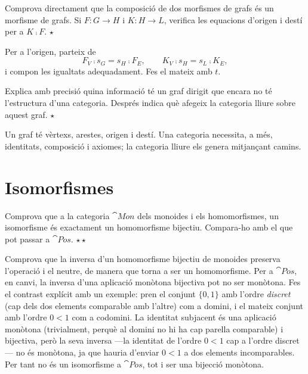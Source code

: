 \begin{exercici}
Comprova directament que la composició de dos morfismes de grafs és un morfisme de grafs. Si $F\colon G\to H$ i $K\colon H\to L$, verifica les equacions d'origen i destí per a $K\comp F$. \hfill{\normalfont$\star$}
\begin{indicacio}
Per a l'origen, parteix de
\[
F_V\comp s_G=s_H\comp F_E,
\qquad
K_V\comp s_H=s_L\comp K_E,
\]
i compon les igualtats adequadament. Fes el mateix amb $t$.
\end{indicacio}
\end{exercici}

\begin{exercici}
Explica amb precisió quina informació té un graf dirigit que encara no té l'estructura d'una categoria. Després indica què afegeix la categoria lliure sobre aquest graf. \hfill{\normalfont$\star$}
\begin{indicacio}
Un graf té vèrtexs, arestes, origen i destí. Una categoria necessita, a més, identitats, composició i axiomes; la categoria lliure els genera mitjançant camins.
\end{indicacio}
\end{exercici}

\section{Isomorfismes}

\begin{exercici}
Comprova que a la categoria $\cat{Mon}$ dels monoides i els homomorfismes, un isomorfisme és exactament un homomorfisme bijectiu. Compara-ho amb el que pot passar a $\cat{Pos}$. \hfill{\normalfont$\star\star$}
\begin{indicacio}
Comprova que la inversa d'un homomorfisme bijectiu de monoides preserva l'operació i el neutre, de manera que torna a ser un homomorfisme. Per a $\cat{Pos}$, en canvi, la inversa d'una aplicació monòtona bijectiva pot no ser monòtona. Fes el contrast explícit amb un exemple: pren el conjunt $\{0,1\}$ amb l'ordre \emph{discret} (cap dels dos elements comparable amb l'altre) com a domini, i el mateix conjunt amb l'ordre $0<1$ com a codomini. La identitat subjacent és una aplicació monòtona (trivialment, perquè al domini no hi ha cap parella comparable) i bijectiva, però la seva inversa ---la identitat de l'ordre $0<1$ cap a l'ordre discret--- no és monòtona, ja que hauria d'enviar $0<1$ a dos elements incomparables. Per tant no és un isomorfisme a $\cat{Pos}$, tot i ser una bijecció monòtona.
\end{indicacio}
\end{exercici}

